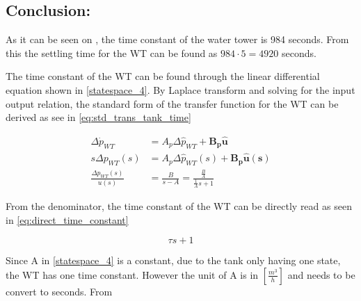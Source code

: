 \subsection*{Conclusion:}
As it can be seen on , the time constant of the water tower is 984 seconds. From this the settling time for the WT can be found as $984\cdot 5 = 4920$ seconds.






The time constant of the WT can be found through the linear differential equation shown in \eqref{statespace_4}. By Laplace transform and solving for the input output relation, the standard form of the transfer function for the WT can be derived as see in \eqref{eq:std_trans_tank_time}

\begin{equation}
	\begin{split}
	\Delta \dot{p}_{WT} &= A_p \Delta \hat{p}_{WT}  + \pmb{B_p}\pmb{\hat{u}}\\
	s\Delta p_{WT}(s) &= A_p \Delta \hat{p}_{WT}(s)  + \pmb{B_p}\pmb{\hat{u}(s)}\\
	\frac{\Delta p_{WT}(s)}{u(s)} &= \frac{B}{s-A} = \frac{\frac{B}{A}}{\frac{1}{A}s + 1}
	\end{split}
	\label{eq:std_trans_tank_time}
\end{equation}

From the denominator, the time constant of the WT can be directly read as seen in \eqref{eq:direct_time_constant}

\begin{equation}
	\tau s + 1
	\label{eq:direct_time_constant}
\end{equation}

Since A in \eqref{statespace_4} is a constant, due to the tank only having one state, the WT has one time constant. However the unit of A is in $[\frac{m^3}{h}]$ and needs to be convert to seconds. From %
